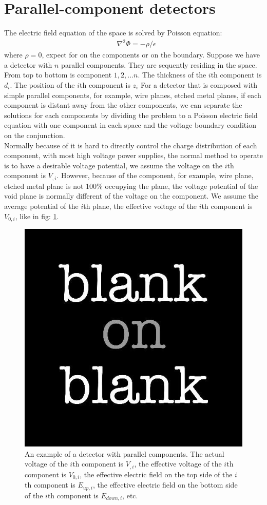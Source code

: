 \section{Parallel-component detectors}
The electric field equation of the space is solved by Poisson equation:
\begin{align}
&\nabla^2\Phi = -\rho/\epsilon 
\end{align}
where $\rho = 0$, expect for on the components or on the boundary.
Suppose we have a detector with $n$ parallel components. They are sequently residing in the space. From top to bottom is component $1,2, ... n$. The thickness of the $i$th component is $d_i$. The position of the $i$th component is $z_i$   
For a detector that is composed with simple parallel components, for example, wire planes, etched metal planes, if each component is distant away from the other components, we can separate the solutions for each components by dividing the problem to a Poisson electric field equation with one component in each space and the voltage boundary condition on the conjunction.\\
Normally because of it is hard to directly control the charge distribution of each component, with most high voltage power supplies, the normal method to operate is to have a desirable voltage potential, we assume the voltage on the $i$th component is $V_{,i}$. However, because of the component, for example, wire plane, etched metal plane is not 100\% occupying the plane, the voltage potential of the void plane is normally different of the voltage on the component. We assume the average potential of the $i$th plane, the effective voltage of the $i$th component is $V_{0,i}$, like in fig: \ref{fig: parallel dec}.
\begin{figure}
\centering
\includegraphics[width=.5\textwidth]{blank.jpg}
\caption{An example of a detector with parallel components. The actual voltage of the $i$th component is $V_{,i}$, the effective voltage of the $i$th component is $V_{0,i}$, the effective electric field on the top side of the $i$th component is $E_{up,i}$, the effective electric field on the bottom side of the $i$th component is $E_{down,i}$, etc.}
\label{fig: parallel dec}
\end{figure}
